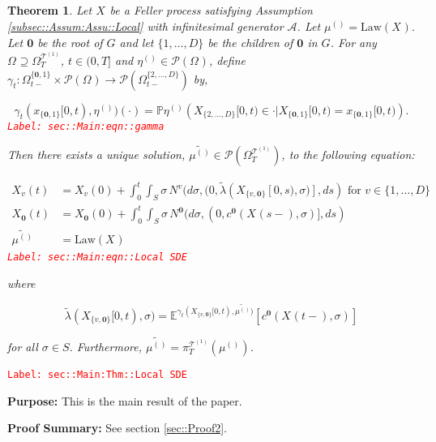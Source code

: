 \documentclass[12pt]{article}
\newcommand{\mb}{\mathbb}
\newcommand{\mc}{\mathcal}
\newcommand{\ra}{\rightarrow}
\newcommand{\te}{\text}
\newcommand{\tr}{\textcolor{red}}
\newcommand{\labe}[1]{\tr{\texttt{Label: #1}}}
\newcommand{\purpose}{\textbf{Purpose: }}
\newcommand{\pfsum}{\textbf{Proof Summary: }}
\newcommand{\pr}{\mb{P}}							%
\newcommand{\exmu}[2]{\mb{E}^{#1}\left[#2\right]}	%
\newcommand{\pmsr}{\mc{P}}							%
\renewcommand{\root}{\mathbf{0}}				%
\renewcommand{\v}{v}							%
\renewcommand{\S}{S}							%
\newcommand{\s}{\sigma}							%
\newcommand{\T}{T}								%
\newcommand{\x}{x}								%
\renewcommand{\t}{t}							%
\newcommand{\sset}{\Omega}						%
\newcommand{\proj}{\pi}							%
\renewcommand{\tt}{s}							%
\newcommand{\X}{X}								%
\newcommand{\IG}{\mc{A}}						%
\newcommand{\IGr}{c}							%
\newcommand{\vind}[1]{^{#1}}					%
\newcommand{\vsi}[1]{^{#1}}						%
\newcommand{\cind}[1]{_{#1}}					%
\newcommand{\tp}[1]{(#1)}						%
\newcommand{\tip}[1]{#1}						%
\newcommand{\ts}[1]{_{#1}}						%
\newcommand{\degr}{D}							%
\newcommand{\tree}{\mc{T}}						%
\newcommand{\sln}[1]{^{(#1)}}					%
\newcommand{\poiss}{N}							%
\newcommand{\alt}[1]{\widetilde{#1}}			%
\newcommand{\m}{\mu}							%
\newcommand{\mmm}{\eta}							%
\newcommand{\cm}{\gamma}						%
\newcommand{\law}{\te{Law}}						%
\newcommand{\crate}{\alt{\lambda}}				%
\newtheorem{thms}{Theorem}[section]
\begin{document}
\begin{thms}
Let \(\X\cind{}\tip{}\) be a Feller process satisfying Assumption \ref{subsec::Assum:Assu::Local} with infinitesimal generator \(\IG\). Let \(\m\sln{}\ts{} = \law(\X\cind{}\tip{})\). Let \(\root\) be the root of \(G\) and let \(\{1,\dots,\degr\}\) be the children of \(\root\) in \(G\). For any \(\sset\vsi{}\ts{} \supseteq\sset\vsi{\tree\sln{1}}\ts{\T}\), \(\t\in (0,\T]\) and \(\mmm\sln{}\ts{} \in \pmsr(\sset\vsi{}\ts{})\), define \(\cm\ts{\t}:\sset\vsi{\{\root,1\}}\ts{\t-}\times \pmsr(\sset\vsi{}\ts{}) \ra \pmsr(\sset\vsi{\{2,\dots,\degr\}}\ts{\t-})\) by,

\begin{equation}
\cm\ts{\t}(\x\cind{\{\root,1\}}\tip{[0,\t)},\mmm\sln{}\ts{})(\cdot) = \pr{\mmm\sln{}\ts{}}\left(\X\cind{\{2,\dots,\degr\}}\tip{[0,\t)} \in \cdot|\X\cind{\{\root,1\}}\tip{[0,\t)} = \x\cind{\{\root,1\}}\tip{[0,\t)}\right).
\label{sec::Main:eqn::gamma}
\end{equation}
\labe{sec::Main:eqn::gamma}

Then there exists a unique solution, \(\alt{\m\sln{}\ts{}} \in \pmsr(\sset\vsi{\tree\sln{1}}\ts{\T})\), to the following equation:

\begin{align}
\X\cind{\v}\tp{\t} &= \X\cind{\v}\tp{0} + \int_0^\t\int_\S \s\,\poiss\vind{\v}(d\s,(0,\crate{}(\X\cind{\{\v,\root\}}\tip{[0,\tt)},\s)],d\tt) \te{ for } \v \in \{1,\dots,\degr\}\nonumber\\
\X\cind{\root}\tp{\t} &= \X\cind{\root}\tp{0} + \int_0^\t\int_\S \s\,\poiss\vind{\root}(d\s,(0,\IGr\vind{\root}(\X\cind{}\tp{\tt-},\s)],d\tt)\nonumber\\
\alt{\m\sln{}\ts{}} &= \law(\X\cind{}\tip{})
\label{sec::Main:eqn::Local SDE}
\end{align}
\labe{sec::Main:eqn::Local SDE}

where

\[\crate{}(\X\cind{\{\v,\root\}}\tip{[0,\t)},\s) = \exmu{\cm\ts{\t}(\X\cind{\{\v,\root\}}\tip{[0,\t)},\alt{\m\sln{}\ts{}})}{\IGr\vind{\root}(\X\cind{}\tp{\t-},\s)}\]

for all \(\s\in \S\). Furthermore, \(\alt{\m\sln{}\ts{}} = \proj\vsi{\tree\sln{1}}\ts{\T}(\m\sln{}\ts{})\).
\label{sec::Main:Thm::Local SDE}
\end{thms}
\labe{sec::Main:Thm::Local SDE}

\purpose This is the main result of the paper. 

\pfsum See section \ref{sec::Proof2}.
\end{document}
